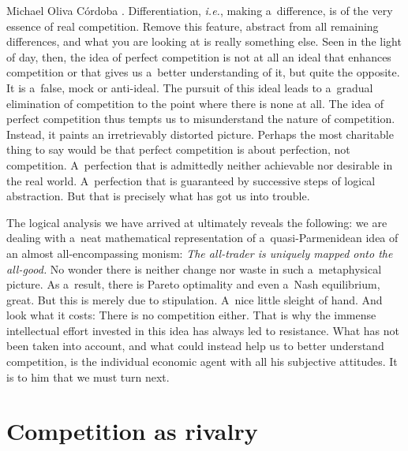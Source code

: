\begin{artengenv}{Michael Oliva Córdoba}
\parencite[][p.33]{armentano_myths_1972}. %
 Differentiation, \textit{i.e.}, making a~difference, is of the very essence of real competition. Remove this feature, abstract from all remaining differences, and what you are looking at is really something else. Seen in the light of day, then, the idea of perfect competition is not at all an ideal that enhances competition or that gives us a~better understanding of it, but quite the opposite. It is a~false, mock or anti-ideal. The pursuit of this ideal leads to a~gradual elimination of competition to the point where there is none at all. The idea of perfect competition thus tempts us to misunderstand the nature of competition. Instead, it paints an irretrievably distorted picture. Perhaps the most charitable thing to say would be that perfect competition is about perfection, not competition. A~perfection that is admittedly neither achievable nor desirable in the real world. A~perfection that is guaranteed by successive steps of logical abstraction. But that is precisely what has got us into trouble.



The logical analysis we have arrived at ultimately reveals the following: we are dealing with a~neat mathematical representation of a~quasi-Parmenidean idea of an almost all-encompassing monism: \textit{The all-trader is uniquely mapped onto the all-good.} No wonder there is neither change nor waste in such a~metaphysical picture. As a~result, there is Pareto optimality and even a~Nash equilibrium, great. But this is merely due to stipulation. A~nice little sleight of hand. And look what it costs: There is no competition either. That is why the immense intellectual effort invested in this idea has always led to resistance. What has not been taken into account, and what could instead help us to better understand competition, is the individual economic agent with all his subjective attitudes. It is to him that we must turn next.



\section{Competition as rivalry}


\end{artengenv}
